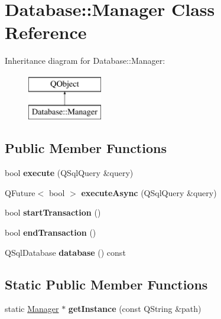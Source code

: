 \hypertarget{classDatabase_1_1Manager}{}\section{Database\+:\+:Manager Class Reference}
\label{classDatabase_1_1Manager}
Inheritance diagram for Database\+:\+:Manager\+:\begin{figure}[H]
\begin{center}
\leavevmode
\includegraphics[height=2.000000cm]{classDatabase_1_1Manager}
\end{center}
\end{figure}
\subsection*{Public Member Functions}
\begin{DoxyCompactItemize}
\item 
\mbox{\label{classDatabase_1_1Manager_a0afd7a0884097a8dcff61b0444f39fb4}} 
bool {\bfseries execute} (Q\+Sql\+Query \&query)
\item 
\mbox{\label{classDatabase_1_1Manager_af8b7852a0062a6a88c15fe25d50892cf}} 
Q\+Future$<$ bool $>$ {\bfseries execute\+Async} (Q\+Sql\+Query \&query)
\item 
\mbox{\label{classDatabase_1_1Manager_adbe8be75b47c9770556464859bcc3017}} 
bool {\bfseries start\+Transaction} ()
\item 
\mbox{\label{classDatabase_1_1Manager_a08dc190a448c555f8334bdd60d32b26e}} 
bool {\bfseries end\+Transaction} ()
\item 
\mbox{\label{classDatabase_1_1Manager_aecc5a00737bf6392cccda37a99138d8c}} 
Q\+Sql\+Database {\bfseries database} () const
\end{DoxyCompactItemize}
\subsection*{Static Public Member Functions}
\begin{DoxyCompactItemize}
\item 
\mbox{\label{classDatabase_1_1Manager_a8ab94815d27e9de4c53fc5a76c919ecf}} 
static \mbox{\hyperlink{classDatabase_1_1Manager}{Manager}} $\ast$ {\bfseries get\+Instance} (const Q\+String \&path)
\end{DoxyCompactItemize}
